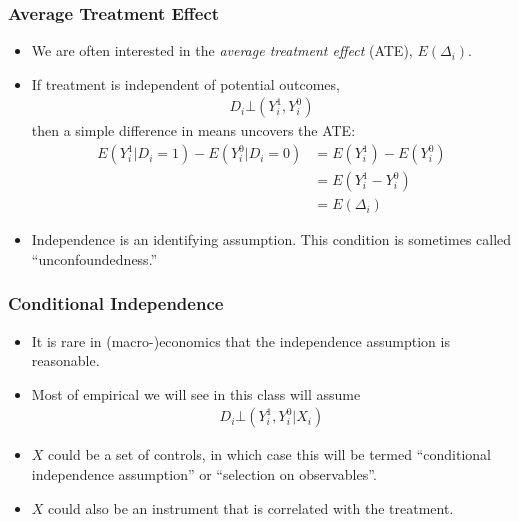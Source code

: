 \documentclass[english,xcolor=svgnames]{beamer}
\begin{document}
\begin{frame}
\frametitle[alignment=center]{Average Treatment Effect}
\begin{itemize}
	\item We are often interested in the \emph{average treatment effect} (ATE), $E(\Delta_i)$.
	\item If treatment is independent of potential outcomes,
	\begin{align*}
		D_i \bot (Y_i^1, Y_i^0)
	\end{align*}
	then a simple difference in means uncovers the ATE:
	\begin{align*}
		E(Y_i^1 | D_i=1 ) - E(Y_i^0 | D_i=0 ) &= E(Y_i^1  ) - E(Y_i^0) \\
		 &= E(Y_i^1  - Y_i^0) \\
		 &= E(\Delta_i) 
	\end{align*}
	\item Independence is an identifying assumption. This condition is sometimes called ``unconfoundedness.''
\end{itemize}
\end{frame}

\begin{frame}
\frametitle[alignment=center]{Conditional Independence}
\begin{itemize}
	\item It is rare in (macro-)economics that the independence assumption is reasonable. 
	\item Most of empirical we will see in this class will assume
		\begin{align*}
		D_i \bot (Y_i^1, Y_i^0 | X_i)
	\end{align*}
	\item $X$ could be a set of controls, in which case this will be termed ``conditional independence assumption'' or ``selection on observables''.
	\item $X$ could also be an instrument that is correlated with the treatment.
\end{itemize}
\end{frame}
\end{document}
